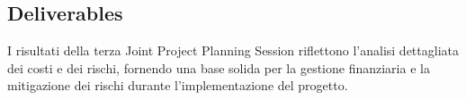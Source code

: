 \subsection{Deliverables}

I risultati della terza Joint Project Planning Session riflettono l'analisi dettagliata dei costi e dei rischi, fornendo una base solida per la gestione finanziaria e la mitigazione dei rischi durante l'implementazione del progetto.